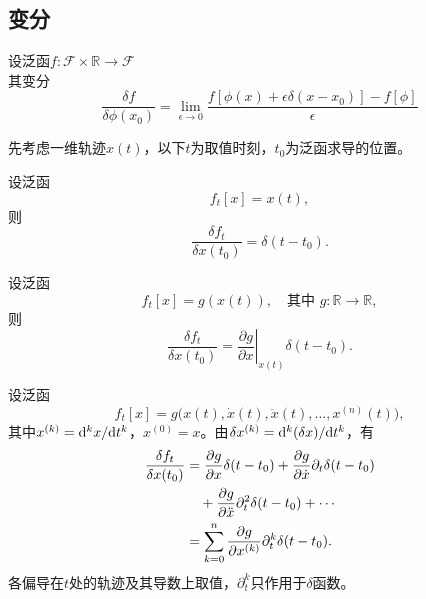 \subsection{变分}
\begin{definition}[变分]
    设泛函$f: \mathcal{F}\times\mathbb{R} \to \mathcal{F}$\\
    其变分
    \begin{equation}
        \frac{\delta f}{\delta \phi(x_0)} = \lim_{\epsilon \to 0} \frac{f[\phi(x) + \epsilon \delta(x-x_0)] - f[\phi]}{\epsilon}
    \end{equation}
\end{definition}
先考虑一维轨迹$x(t)$，以下$t$为取值时刻，$t_0$为泛函求导的位置。
\begin{example}
    设泛函
    \begin{equation}
        f_t[x]=x(t),
    \end{equation}
    则
    \begin{equation}
        \frac{\delta f_t}{\delta x(t_0)}=\delta(t-t_0).
    \end{equation}
\end{example}
\begin{example}
    设泛函
    \begin{equation}
        f_t[x]=g(x(t)),\quad\text{其中 }g:\mathbb R\to\mathbb R,
    \end{equation}
    则
    \begin{equation}
        \frac{\delta f_t}{\delta x(t_0)}
        =\left.\frac{\partial g}{\partial x}\right|_{x(t)}\delta(t-t_0).
    \end{equation}
\end{example}
\begin{example}
    设泛函
    \begin{equation}
        f_t[x]=g\bigl(x(t),\dot x(t),\ddot x(t),\ldots,x^{(n)}(t)\bigr),
    \end{equation}
    其中$x^{(k)}=\mathrm d^kx/\mathrm d t^k$，$x^{(0)}=x$。由$\delta x^{(k)}=\mathrm d^k(\delta x)/\mathrm d t^k$，有
    \begin{align}
        \frac{\delta f_t}{\delta x(t_0)}
        & =\frac{\partial g}{\partial x}\delta(t-t_0)
        +\frac{\partial g}{\partial\dot x}\partial_t\delta(t-t_0)\notag\\
        &\quad+\frac{\partial g}{\partial\ddot x}\partial_t^2\delta(t-t_0)+\cdots\notag\\
        & =\sum_{k=0}^n\frac{\partial g}{\partial x^{(k)}}\partial_t^k\delta(t-t_0).
    \end{align}
    各偏导在$t$处的轨迹及其导数上取值，$\partial_t^k$只作用于$\delta$函数。
\end{example}
